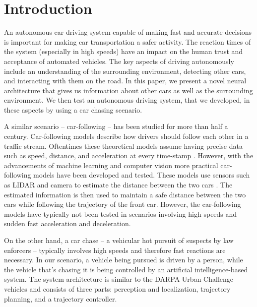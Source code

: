 \documentclass{ctuthesis/ctuthesis}
\begin{document}
\maketitle

\chapter{Introduction}
An autonomous car driving system capable of making fast and accurate decisions is important for making car transportation a safer activity. The reaction times of the system (especially in high speeds) have an impact on the human trust and acceptance of automated vehicles. The key aspects of driving autonomously include an understanding of the surrounding environment, detecting other cars, and interacting with them on the road. In this paper, we present a novel neural architecture that gives us information about other cars as well as the surrounding environment. We then test an autonomous driving system, that we developed, in these aspects by using a car chasing scenario. \par


A similar scenario -- car-following -- has been studied for more than half a century. Car-following models describe how drivers should follow each other in a traffic stream. Oftentimes these theoretical models assume having precise data such as speed, distance, and acceleration at every time-stamp \cite{car_following}. However, with the advancements of machine learning and computer vision more practical car-following models have been developed and tested. These models use sensors such as LIDAR and camera to estimate the distance between the two cars \cite{lidar_highway}. The estimated information is then used to maintain a safe distance between the two cars while following the trajectory of the front car. However, the car-following models have typically not been tested in scenarios involving high speeds and sudden fast acceleration and deceleration. \par
 
 
On the other hand, a car chase -- a vehicular hot pursuit of suspects by law enforcers -- typically involves high speeds and therefore fast reactions are necessary. In our scenario, a vehicle being pursued is driven by a person, while the vehicle that's chasing it is being controlled by an artificial intelligence-based system. The system architecture is similar to the DARPA Urban Challenge vehicles \cite{Bertha}\cite{darpa2}\cite{darpa_book} and consists of three parts: perception and localization, trajectory planning, and a trajectory controller. \par
\end{document}
